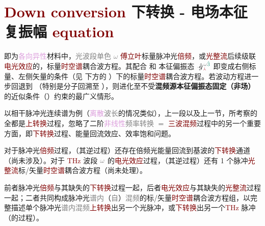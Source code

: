 \vspace*{-1.0em}

\section{\textcolor{Maroon}{Down conversion} 下转换 - 电场本征复振幅 \textcolor{Maroon}{equation}}\label{sec:down_convert}

 即为\textcolor{Plum}{各向异性}材料中，\textcolor{gray}{光波段单色 $\omega$} \textcolor{Maroon}{傅立叶}标量\textcolor{NavyBlue}{脉冲光}\textcolor{Maroon}{倍频}，或\textcolor{Maroon}{光整流}后续级联\textcolor{Maroon}{电光效应}的，标量\textcolor{Maroon}{时空谱}耦合波方程。其配合  和 \textcolor{PineGreen}{本征偏振态} $\Xint{{}^{}_{\mathcolor{gray}{-}}}{10}{\hat{g}}^{\;\!\mathcolor{gray}{\omega} \textcolor{PineGreen}{\hat{3}}}_{\;\! \textcolor{Maroon}{\Yup}}$ 即变成右侧标量、左侧矢量的条件（见  下方的 ）下的标量\textcolor{Maroon}{时空谱}耦合波方程。若波动方程进一步回退到 （特别是分子回溯至 ），则进化至不受\textbf{\textcolor{NavyBlue}{混频源}\textcolor{PineGreen}{本征偏振态}固定（非场）}的近似条件（）约束的最广义情形。

以相干\textcolor{NavyBlue}{脉冲光连续谱}为例（\textcolor{Plum}{离散}\textcolor{gray}{波长}的情况类似），上一段以及上一节，所考察的全都是\textcolor{Maroon}{上转换}过程，忽略了二阶\textcolor{Plum}{非线性}\textcolor{gray}{频率转换} $=$ \textcolor{Maroon}{三波混频}过程中的另一个重要方面，即\textcolor{Maroon}{下转换}过程、\textcolor{NavyBlue}{能量回流}效应、\textcolor{NavyBlue}{效率饱和}问题。

对于\textcolor{NavyBlue}{脉冲光}\textcolor{Maroon}{倍频}过程，（其逆过程）还存在\textcolor{NavyBlue}{倍频光}能量回流到\textcolor{NavyBlue}{基波}的\textcolor{Maroon}{下转换}通道（尚未涉及）。对于 \textcolor{Maroon}{THz} 波段 $\textcolor{gray}{\omega}$ 的\textcolor{Maroon}{电光效应}过程，（其逆过程）还有 1 个\textcolor{NavyBlue}{脉冲}\textcolor{Maroon}{光整流}标/矢量\textcolor{Maroon}{时空谱}耦合波方程（尚未处理）。

前者\textcolor{NavyBlue}{脉冲光}\textcolor{Maroon}{倍频}与其缺失的\textcolor{Maroon}{下转换}过程一起，后者\textcolor{Maroon}{电光效应}与其缺失的\textcolor{Maroon}{光整流}过程一起；二者共同构成\textcolor{NavyBlue}{脉冲光}\textcolor{gray}{谱内}（\textcolor{gray}{自}）\textcolor{gray}{混频}的标/矢量\textcolor{Maroon}{时空谱}耦合波方程组，以完整描述单个\textcolor{NavyBlue}{脉冲光}\textcolor{gray}{谱内混频}\textcolor{Maroon}{上转换}出另一个\textcolor{NavyBlue}{光脉冲}，或\textcolor{Maroon}{下转换}出另一个\textcolor{Maroon}{THz} \textcolor{NavyBlue}{脉冲}（的过程）。

